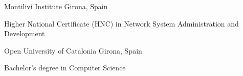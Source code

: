 \documentclass[]{awesome-cv}
\begin{document}
\vspace{10mm}
\begin{cventries}
	\vspace{2mm}
	\cventry
	{}
	{Montilivi Institute \vspace{-5mm}}
	{Girona, Spain \vspace{-5mm}}
	{}
	{\begin{sectionnormaltext} 
		\item{Higher National Certificate (HNC) in Network System Administration and Development}
	\end{sectionnormaltext}}

 \cventry
	{}
	{Open University of Catalonia \vspace{-5mm}}
	{Girona, Spain \vspace{-5mm}}
	{}
	{\begin{sectionnormaltext} 
		\item{Bachelor's degree in Computer Science}
	\end{sectionnormaltext}}
\end{cventries}
\end{document}
